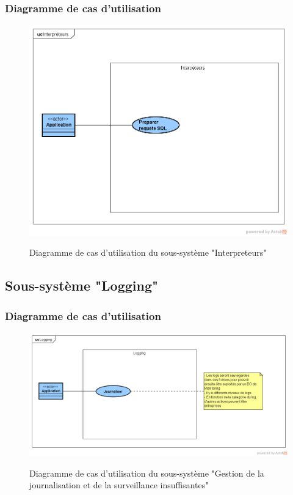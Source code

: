 \subsubsection{Diagramme de cas d'utilisation}
\begin{figure}[H]
	\centering
	\begin{minipage}{12cm}
		\centering
		{\includegraphics[height=0.35\textheight, width=1\textwidth]{fig/Interpreteurs-use-case-diagram.png}}
	\end{minipage}
	\caption{Diagramme de cas d'utilisation du sous-système "Interpreteurs"}
	\label{fig:7.18}
\end{figure}


\subsection{Sous-système "Logging"}
\subsubsection{Diagramme de cas d'utilisation}
\begin{figure}[H]
	\centering
	\begin{minipage}{12cm}
		\centering
		{\includegraphics[height=0.35\textheight, width=1\textwidth]{fig/Logging-use-case-diagram.png}}
	\end{minipage}
	\caption{Diagramme de cas d'utilisation du sous-système "Gestion de la journalisation et de la surveillance insuffisantes"}
	\label{fig:7.19}
\end{figure}

